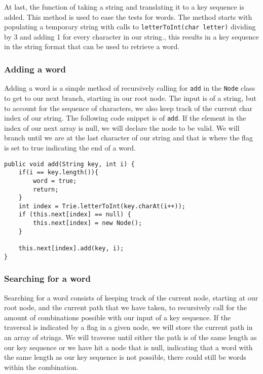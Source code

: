 \documentclass[a4paper,11pt]{article}
\begin{document}
            At last, the function of taking a string and translating it to a key sequence is added. This method is used to ease the tests for words. The method starts with populating a temporary string with calls to \texttt{letterToInt(char letter)} dividing by 3 and adding 1 for every character in our string., this results in a key sequence in the string format that can be used to retrieve a word.

        \subsubsection*{Adding a word}

            Adding a word is a simple method of recursively calling for \texttt{add} in the \texttt{Node} class to get to our next branch, starting in our root node. The input is of a string, but to account for the sequence of characters, we also keep track of the current char index of our string. The following code snippet is of \texttt{add}. If the element in the index of our next array is null, we will declare the node to be valid. We will branch until we are at the last character of our string and that is where the flag is set to true indicating the end of a word.
\begin{verbatim}
public void add(String key, int i) {
    if(i == key.length()){
        word = true;
        return;
    }
    int index = Trie.letterToInt(key.charAt(i++));
    if (this.next[index] == null) {
        this.next[index] = new Node();
    }
    
    this.next[index].add(key, i);
}
\end{verbatim}

        \subsubsection*{Searching for a word}

            Searching for a word consists of keeping track of the current node, starting at our root node, and the current path that we have taken, to recursively call for the amount of combinations possible with our input of a key sequence. If the traversal is indicated by a flag in a given node, we will store the current path in an array of strings. We will traverse until either the path is of the same length as our key sequence or we have hit a node that is null, indicating that a word with the same length as our key sequence is not possible, there could still be words within the combination.
\end{document}
